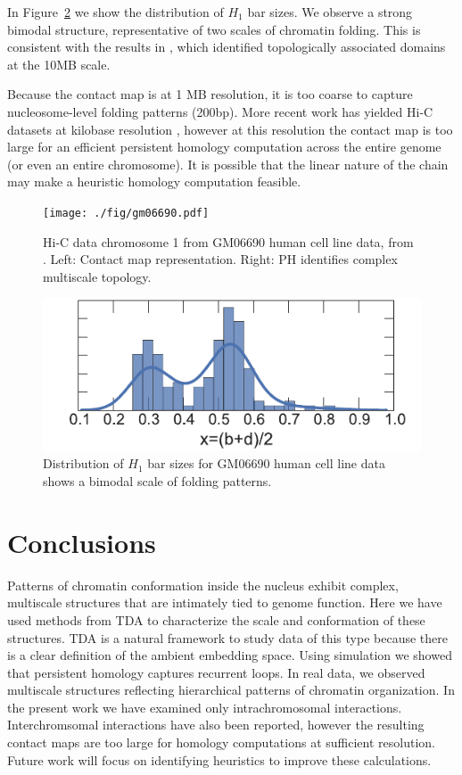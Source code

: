 In Figure~\ref{fig:human_data_histogram} we show the distribution of $H_1$ bar sizes.
We observe a strong bimodal structure, representative of two scales of chromatin folding.
This is consistent with the results in \cite{LiebermanAiden:2009jz}, which identified topologically associated domains at the 10MB scale.

Because the contact map is at 1 MB resolution, it is too coarse to capture nucleosome-level folding patterns (200bp).
More recent work has yielded Hi-C datasets at kilobase resolution \cite{Jin:2013hm,Rao:2014eo}, however at this resolution the contact map is too large for an efficient persistent homology computation across the entire genome (or even an entire chromosome).
It is possible that the linear nature of the chain may make a heuristic homology computation feasible.

\begin{figure}
       \centering
       \texttt{[image: ./fig/gm06690.pdf]}
       \caption{Hi-C data chromosome 1 from GM06690 human cell line data, from \cite{LiebermanAiden:2009jz}. Left: Contact map representation. Right: PH identifies complex multiscale topology.}
       \label{fig:human_data}
\end{figure}

\begin{figure}
       \centering
       \includegraphics[width=\columnwidth]{./fig/gm06690_barsizes_v2.pdf}
       \caption{Distribution of $H_1$ bar sizes for GM06690 human cell line data shows a bimodal scale of folding patterns.}
       \label{fig:human_data_histogram}
\end{figure}

\section{Conclusions}
\label{sec:conclusions}
%
Patterns of chromatin conformation inside the nucleus exhibit complex, multiscale structures that are intimately tied to genome function.
Here we have used methods from TDA to characterize the scale and conformation of these structures.
TDA is a natural framework to study data of this type because there is a clear definition of the ambient embedding space.
Using simulation we showed that persistent homology captures recurrent loops.
In real data, we observed multiscale structures reflecting hierarchical patterns of chromatin organization.
In the present work we have examined only intrachromosomal interactions.
Interchromsomal interactions have also been reported, however the resulting contact maps are too large for homology computations at sufficient resolution.
Future work will focus on identifying heuristics to improve these calculations.